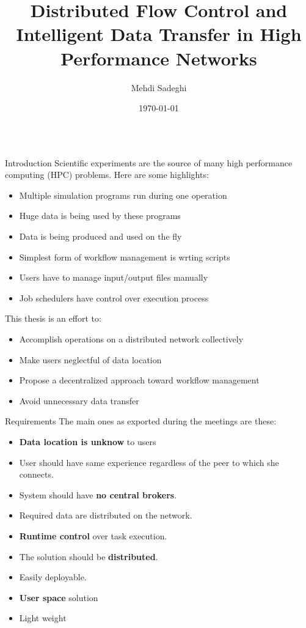 \documentclass[final,hyperref={pdfpagelabels=true}]{beamer}
\title[Communication and Media Engineering]{Distributed Flow Control and Intelligent Data Transfer in High Performance Networks}
\author[msadeghi@stud.hs-offenburg.de]{Mehdi Sadeghi}
\institute[]{%
  Hochschule für Technik, Wirtschaft und Medien Offenburg\\[0.25\baselineskip]
  Fakultät Medien und Informationswesen\\[0.25\baselineskip]
  Professorin: Dr. Katharina Mehner-Heindl\\[0.25\baselineskip]
  Betreuer: Dr. Adham Hashibon
}
\date[\today]{\today}
\begin{document}
\begin{frame}
\fontsize{27pt}{28}\selectfont
  \begin{columns}[t]
    \begin{column}{.45\textwidth}
      \begin{block}{Introduction}
Scientific experiments are the source of many high performance computing (HPC) problems. Here are
some highlights:

\begin{itemize}
\item Multiple simulation programs run during one operation
\item Huge data is being used by these programs
\item Data is being produced and used on the fly
\item Simplest form of workflow management is wrting scripts
\item Users have to manage input/output files manually
\item Job schedulers have control over execution process
\end{itemize}

      This thesis is an effort to:%
      \begin{itemize}
      \item Accomplish operations on a distributed network collectively
      \item Make users neglectful of data location
      \item Propose a decentralized approach toward workflow management
      \item Avoid unnecessary data transfer
      \end{itemize}

      \end{block}
      
      \begin{block}{Requirements}
      The main ones as exported during the meetings are these:
        \begin{itemize}
        \item \textbf{Data location is unknow} to users
        \item User should have same experience regardless of the peer to which she connects.
        \item System should have \textbf{no central brokers}.
        \item Required data are distributed on the network.
        \item \textbf{Runtime control} over task execution.
        \item The solution should be \textbf{distributed}.
        \item Easily deployable.
        \item \textbf{User space} solution
        \item Light weight
        \end{itemize}
      \end{block}


\end{column}
\end{columns}
\end{frame}
\end{document}
